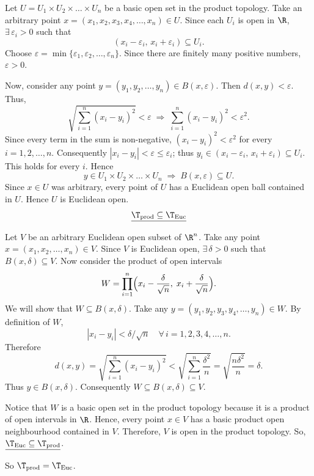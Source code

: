 
Let $U=U_1\times U_2\times\dots\times U_n$ be a basic open set in the product topology.
Take an arbitrary point $x=(x_1,x_2,x_3,x_4,\dots,x_n)\in U$. Since each $U_i$ is open in $\R$,
$\exists\,\varepsilon_i>0$ such that
\[ (x_i-\varepsilon_i,\,x_i+\varepsilon_i)\subseteq U_i. \]
Choose $\varepsilon=\min\{\varepsilon_1,\varepsilon_2,\dots,\varepsilon_n\}$. Since there are
finitely many positive numbers, $\varepsilon>0$.

Now, consider any point $y=(y_1,y_2,\dots,y_n)\in B(x,\varepsilon)$. Then
$d(x,y)<\varepsilon$. Thus,
\[ \sqrt{\sum_{i=1}^n(x_i-y_i)^2}<\varepsilon
   \;\Rightarrow\; \sum_{i=1}^n(x_i-y_i)^2<\varepsilon^2. \]
Since every term in the sum is non-negative, $(x_i-y_i)^2<\varepsilon^2$ for every
$i=1,2,\dots,n$. Consequently $|x_i-y_i|<\varepsilon\le\varepsilon_i$; thus
$y_i\in(x_i-\varepsilon_i,\,x_i+\varepsilon_i)\subseteq U_i$. This holds for every $i$. Hence
\[ y\in U_1\times U_2\times\dots\times U_n \;\Rightarrow\; B(x,\varepsilon)\subseteq U. \]
Since $x\in U$ was arbitrary, every point of $U$ has a Euclidean open ball contained in $U$.
Hence $U$ is Euclidean open.
\[ \underline{\T_{\mathrm{prod}}\subseteq\T_{\mathrm{Euc}}} \]

Let $V$ be an arbitrary Euclidean open subset of $\R^n$. Take any point
$x=(x_1,x_2,\dots,x_n)\in V$. Since $V$ is Euclidean open, $\exists\,\delta>0$ such that
$B(x,\delta)\subseteq V$. Now consider the product of open intervals
\[ W=\prod_{i=1}^n\Bigl(x_i-\frac{\delta}{\sqrt n},\;x_i+\frac{\delta}{\sqrt n}\Bigr). \]
We will show that $W\subseteq B(x,\delta)$.
Take any $y=(y_1,y_2,y_3,y_4,\dots,y_n)\in W$. By definition of $W$,
\[ |x_i-y_i|<\delta/\sqrt n\quad\forall\,i=1,2,3,4,\dots,n. \]
Therefore
\[ d(x,y)=\sqrt{\sum_{i=1}^n(x_i-y_i)^2}<\sqrt{\sum_{i=1}^n\frac{\delta^2}{n}}
   =\sqrt{\frac{n\delta^2}{n}}=\delta. \]
Thus $y\in B(x,\delta)$. Consequently $W\subseteq B(x,\delta)\subseteq V$.

Notice that $W$ is a basic open set in the product topology because it is a product of open
intervals in $\R$. Hence, every point $x\in V$ has a basic product open neighbourhood contained
in $V$. Therefore, $V$ is open in the product topology. So,
$\underline{\T_{\mathrm{Euc}}\subseteq\T_{\mathrm{prod}}}$.

So $\T_{\mathrm{prod}}=\T_{\mathrm{Euc}}$.
